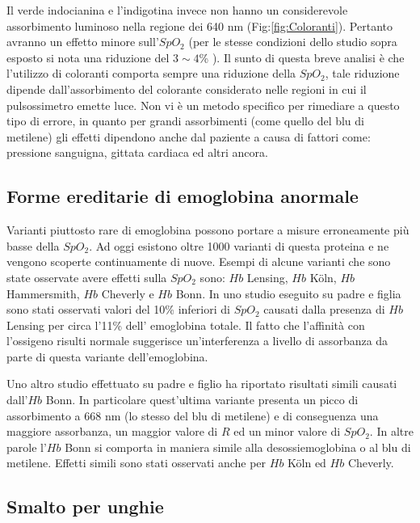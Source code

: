 \documentclass[a4paper, 12pt]{book}
\begin{document}
Il verde indocianina e l'indigotina invece non hanno un considerevole assorbimento luminoso nella regione dei 640 nm (Fig:\ref{fig:Coloranti}).
Pertanto avranno un effetto minore sull'$SpO_2$ (per le stesse condizioni dello studio sopra esposto si nota una riduzione del $3\sim4$\% ).
Il sunto di questa breve analisi è che l'utilizzo di coloranti comporta sempre una riduzione della $SpO_2$, tale riduzione dipende dall'assorbimento del colorante considerato nelle regioni in cui il pulsossimetro emette luce.
Non vi è un metodo specifico per rimediare a questo tipo di errore, in quanto per grandi assorbimenti (come quello del blu di metilene) gli effetti dipendono anche dal paziente a causa di fattori come: pressione sanguigna, gittata cardiaca ed altri ancora.


\subsection{Forme ereditarie di emoglobina anormale}

Varianti piuttosto rare di emoglobina possono portare a misure erroneamente più basse della $SpO_2$.
Ad oggi esistono oltre 1000 varianti di questa proteina e ne vengono scoperte continuamente di nuove.
Esempi di alcune varianti che sono state osservate avere effetti sulla $SpO_2$ sono: $Hb$ Lensing, $Hb$ K\"oln, $Hb$ Hammersmith, $Hb$ Cheverly e $Hb$ Bonn.
In uno studio eseguito su padre e figlia sono stati osservati valori del 10\% inferiori di $SpO_2$ causati dalla presenza di $Hb$ Lensing per circa l'11\% dell' emoglobina totale. %
Il fatto che l'affinità con l'ossigeno risulti normale suggerisce un'interferenza a livello di assorbanza da parte di questa variante dell'emoglobina.
\newline

Uno altro studio effettuato su padre e figlio ha riportato risultati simili causati dall'$Hb$ Bonn. %
In particolare quest'ultima variante presenta un picco di assorbimento a 668 nm (lo stesso del blu di metilene) e di conseguenza una maggiore assorbanza, un maggior valore di $R$ ed un minor valore di $SpO_2$.
In altre parole l'$Hb$ Bonn si comporta in maniera simile alla desossiemoglobina o al blu di metilene.
Effetti simili sono stati osservati anche per $Hb$ K\"oln ed $Hb$ Cheverly.


\subsection{Smalto per unghie}
\end{document}
